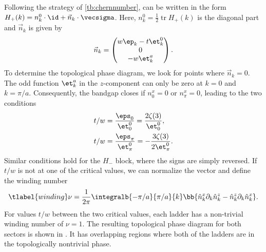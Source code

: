 Following the strategy of \cref{tb:chernnumber},  can be written in the form $H_+(k) = n^0_k \cdot \id + \vec{n}_k \cdot \vecsigma$. Here, $n^0_k = \frac{1}{2} \operatorname{tr} H_+(k)$ is the diagonal part and $\vec{n}_k$ is given by
\begin{align}
    \vec{n}_k = \begin{pmatrix}
        w \ep_k - t \et^0_k \\
        0 \\
        -w \et^a_k
    \end{pmatrix}.
\end{align}
To determine the topological phase diagram, we look for points where $\vec{n}_k=0$.
The odd function $\et^a_k$ in the $z$-component can only be zero at $k = 0$ and $k=\pi/a$.
Consequently, the bandgap closes if $n^x_0 = 0$ or $n^x_{\pi} = 0$, leading to the two conditions
\begin{align}
    t/w  &= \frac{\eps_0}{\et^0_0} = \frac{2\zeta(3)}{\et^0_0}, \\
    t/w  &= \frac{\eps_{\pi}}{\et^0_{\pi}} = - \frac{3 \zeta(3)}{2 \et^0_{\pi}}.
\end{align}
Similar conditions hold for the $H_-$ block, where the signs are simply reversed.
If $t/w$ is not at one of the critical values, we can normalize the vector and define the winding number
\begin{align} \tlabel{winding}
    \nu = \frac{1}{2\pi} \integralb{-\pi/a}{\pi/a}{k} \bb{ \hat{n}^x_k \partial_k \hat{n}^z_k - \hat{n}^z_k \partial_k \hat{n}^x_k }.
\end{align}
For values $t/w$ between the two critical values, each ladder has a non-trivial winding number of $\nu = 1$.
The resulting topological phase diagram for both sectors is shown in .
It has overlapping regions where both of the ladders are in the topologically nontrivial phase.



